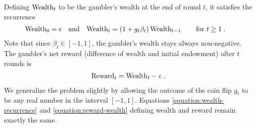 Defining $\operatorname{Wealth}_t$ to be the gambler's wealth at the end of round $t$, it satisfies the
recurrence
\begin{align}
\label{equation:wealth-recurrence}
\operatorname{Wealth}_0 & = \epsilon &
& \text{and} &
\operatorname{Wealth}_t & = (1 + g_t \beta_t) \operatorname{Wealth}_{t-1} \qquad \text{for $t \ge 1$} \; .
\end{align}
Note that since $\beta_t \in [-1,1]$, the gambler's wealth stays always non-negative.
The gambler's net reward (difference of wealth and initial endowment) after $t$
rounds is
\begin{align}
\label{equation:reward-wealth}
\operatorname{Reward}_t = \operatorname{Wealth}_t - \ \epsilon \; .
\end{align}
We generalize the problem slightly by allowing the outcome of the coin flip
$g_t$ to be any real number in the interval $[-1,1]$.  Equations
\eqref{equation:wealth-recurrence} and \eqref{equation:reward-wealth} defining
wealth and reward remain exactly the same.
